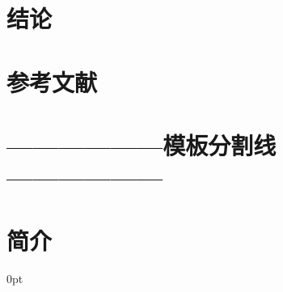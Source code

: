 \documentclass[zihao=-4]{ctexart}
\newcommand{\setParDis}{\setlength {\parskip} {0pt} }
\begin{document}
\section{结论}

\section{参考文献}



\section{——————模板分割线——————}
\section{简介}
\setParDis %
\end{document}
